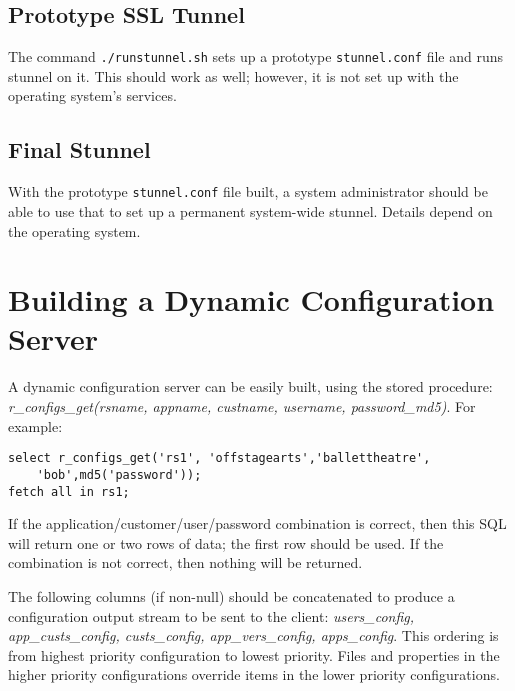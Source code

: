 \documentclass[11pt]{article}
\begin{document}
\subsection{Prototype SSL Tunnel}

The command {\tt ./runstunnel.sh} sets up a prototype {\tt stunnel.conf} file and runs stunnel on it.  This should work as well; however, it is not set up with the operating system's services.

\subsection{Final Stunnel}

With the prototype {\tt stunnel.conf} file built, a system administrator should be able to use that to set up a permanent system-wide stunnel.  Details depend on the operating system.


\section{Building a Dynamic Configuration Server}

A dynamic configuration server can be easily built, using the stored procedure: \emph{r\_configs\_get(rsname, appname, custname, username, password\_md5)}.  For example:
\begin{verbatim}
select r_configs_get('rs1', 'offstagearts','ballettheatre',
    'bob',md5('password'));
fetch all in rs1;
\end{verbatim}

If the application/customer/user/password combination is correct, then this SQL will return one or two rows of data; the first row should be used.  If the combination is not correct, then nothing will be returned.

The following columns (if non-null) should be concatenated to produce a configuration output stream to be sent to the client: \emph{users\_config, app\_custs\_config, custs\_config, app\_vers\_config, apps\_config}.  This ordering is from highest priority configuration to lowest priority.  Files and properties in the higher priority configurations override items in the lower priority configurations.
\end{document}
